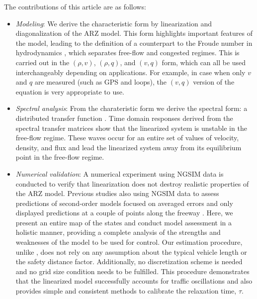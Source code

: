 \documentclass[preprint]{elsarticle}
\begin{document}
The contributions of this article are as follows:

\begin{itemize}
\item \textit{Modeling}: We derive the characteristic form by linearization and diagonalization of the ARZ model. This form highlights important features of the model, leading to the definition of a counterpart to the Froude number in hydrodynamics \cite{litrico2009modeling}, which separates free-flow and congested regimes. This is carried out in the $\left(\rho, v \right)$, $\left(\rho, q\right)$, and $\left(v, q\right)$ form, which can all be used interchangeably depending on applications. For example, in case when only $v$ and $q$ are measured (such as GPS and loops), the $\left(v, q\right)$ version of the equation is very appropriate to use.

\item \textit{Spectral analysis}: From the charateristic form we derive the spectral form: a distributed transfer function \cite{litrico2009modeling}. Time domain responses derived from the spectral transfer matrices show that the linearized system is unstable in the free-flow regime. These waves occur for an entire set of values of velocity, density, and flux and lead the linearized system away from its equilibrium point in the free-flow regime. 

\item \textit{Numerical validation}: A numerical experiment using NGSIM data is conducted to verify that linearization does not destroy realistic properties of the ARZ model. Previous studies also using NGSIM data to assess predictions of second-order models focused on averaged errors and only displayed predictions at a couple of points along the freeway \cite{GodunovARZ,Fan}. Here, we present an entire map of the states and conduct model assessment in a holistic manner, providing a complete analysis of the strengths and weaknesses of the model to be used for control. Our estimation procedure, unlike \cite{Fan}, does not rely on any assumption about the typical vehicle length or the safety distance factor. Additionally, no discretization scheme is needed and no grid size condition needs to be fulfilled. This procedure demonstrates that the linearized model successfully accounts for traffic oscillations and also provides simple and consistent methods to calibrate the relaxation time, $\tau$.
\end{itemize}
\end{document}
